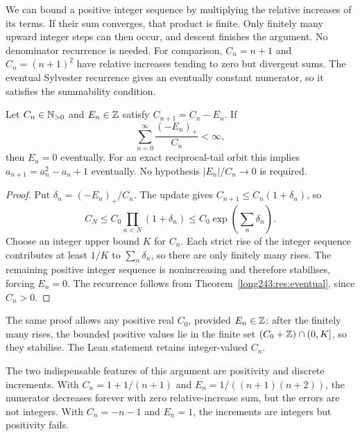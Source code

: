 \documentclass[11pt]{article}
\begin{document}
We can bound a positive integer sequence by multiplying the relative
increases of its terms. If their sum converges, that product is finite.
Only finitely many upward integer steps can then occur, and descent
finishes the argument. No denominator recurrence is needed.
For comparison, $C_n=n+1$ and $C_n=(n+1)^2$ have relative increases
tending to zero but divergent sums. The eventual Sylvester recurrence gives an eventually
constant numerator, so it satisfies the summability condition.

\begin{samepage}
\begin{theorem}\label{long243:res:mass}
Let \(C_n\in\mathbb{N}_{>0}\) and \(E_n\in\mathbb{Z}\) satisfy \(C_{n+1}=C_n-E_n\).
If
\[
 \sum_{n=0}^{\infty}\frac{(-E_n)_+}{C_n}<\infty,
\]
then \(E_n=0\) eventually. For an exact reciprocal-tail orbit this implies
\(a_{n+1}=a_n^2-a_n+1\) eventually. No hypothesis $|E_n|/C_n\to0$ is required.
\end{theorem}
\end{samepage}

\begin{proof}
Put \(\delta_n=(-E_n)_+/C_n\). The update gives
\(C_{n+1}\le C_n(1+\delta_n)\), so
\[
 C_N\le C_0\prod_{n<N}(1+\delta_n)
 \le C_0\exp\!\left(\sum_n\delta_n\right).
\]
Choose an integer upper bound \(K\) for \(C_n\). Each strict rise of the
integer sequence contributes at least \(1/K\) to \(\sum_n\delta_n\), so
there are only finitely many rises. The remaining positive integer sequence
is nonincreasing and therefore stabilises, forcing \(E_n=0\). The recurrence
follows from Theorem~\ref{long243:res:eventual}, since \(C_n>0\).
\end{proof}

The same proof allows any positive real $C_0$, provided $E_n\in\mathbb{Z}$:
after the finitely many rises, the bounded positive values lie in the
finite set $(C_0+\mathbb{Z})\cap(0,K]$, so they stabilise. The Lean statement
retains integer-valued $C_n$.

The two indispensable features of this argument are positivity and
discrete increments. With $C_n=1+1/(n+1)$ and
$E_n=1/((n+1)(n+2))$, the numerator decreases forever with zero
relative-increase sum, but the errors are not integers. With $C_n=-n-1$
and $E_n=1$, the increments are integers but positivity fails.
\end{document}
